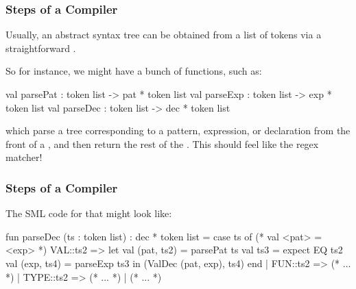 \documentclass[aspectratio=169]{beamer}
\begin{document}
\begin{frame}[fragile]
  \frametitle{Steps of a Compiler}

  Usually, an abstract syntax tree can be obtained from a list of tokens via a
  straightforward .

  \vspace{\fill}


  \vspace{\fill}

  So for instance, we might have a bunch of functions, such as:
  \begin{codeblock}
    val parsePat : token list -> pat * token list
    val parseExp : token list -> exp * token list
    val parseDec : token list -> dec * token list
  \end{codeblock}

  which parse a tree corresponding to a pattern, expression, or declaration from
  the front of a , and then return the rest of the .
  This should feel like the regex matcher!
\end{frame}

\begin{frame}[fragile]
  \frametitle{Steps of a Compiler}

  The SML code for that might look like:

  \small
  \begin{codeblock}
    fun parseDec (ts : token list) : dec * token list =
      case ts of
        (* val <pat> = <exp> *)
        VAL::ts2 =>
          let
            val (pat, ts2) = parsePat ts
            val ts3 = expect EQ ts2
            val (exp, ts4) = parseExp ts3
          in
            (ValDec (pat, exp), ts4)
          end
      | FUN::ts2 => (* ... *)
      | TYPE::ts2 => (* ... *)
      | (* ... *)
  \end{codeblock}
\end{frame}
\end{document}
